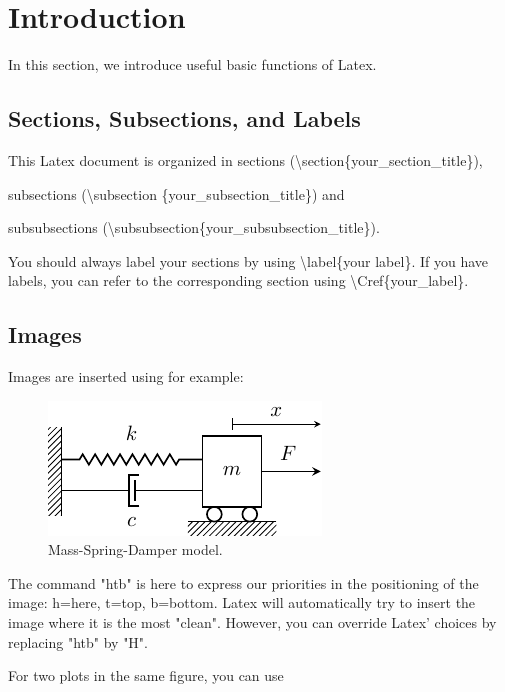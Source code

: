 \chapter{Introduction}\label{introduction}


In this section, we introduce useful basic functions of Latex. 

\section{Sections, Subsections, and Labels}\label{sections_subsections_labels}

This Latex document is organized in sections (\textbackslash section\{your\_section\_title\}), 

subsections (\textbackslash subsection \{your\_subsection\_title\}) and 

subsubsections (\textbackslash subsubsection\{your\_subsubsection\_title\}).

You should always label your sections by using \textbackslash label\{your label\}. If you have labels, you can refer to the corresponding section using \textbackslash Cref\{your\_label\}.


\section{Images}\label{images}

Images are inserted using for example:

\begin{figure}[htb]
    \centering
    \includegraphics[width=0.4\linewidth]{000_introduction/images/Theoretical Background/Spring_Mass_Damper.pdf}
    \caption{Mass-Spring-Damper model.}
    \label{fig:mass_spring_damper}
\end{figure}

The command "htb" is here to express our priorities in the positioning of the image: h=here, t=top, b=bottom. Latex will automatically try to insert the image where it is the most "clean". However, you can override Latex' choices by replacing "htb" by "H".

For two plots in the same figure, you can use

